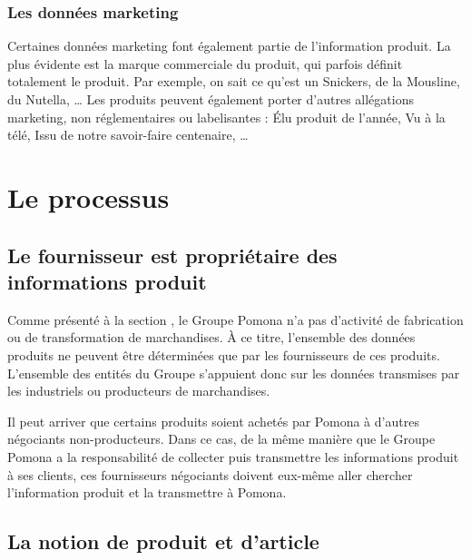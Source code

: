                 \subsubsection{Les données marketing}

                Certaines données marketing font également partie de l'information produit.
                La plus évidente est la marque commerciale du produit, qui parfois définit totalement le produit.
                Par exemple, on sait ce qu'est un Snickers, de la Mousline, du Nutella, \dots
                Les produits peuvent également porter d'autres allégations marketing, non réglementaires ou labelisantes : \'{E}lu produit de l'année, Vu à la télé, Issu de notre savoir-faire centenaire, \dots                

        \section{Le processus}
        
            \subsection{Le fournisseur est propriétaire des informations produit}

            Comme présenté à la section , le Groupe Pomona n'a pas d'activité de fabrication ou de transformation de marchandises.
            \`{A} ce titre, l'ensemble des données produits ne peuvent être déterminées que par les fournisseurs de ces produits.
            L'ensemble des entités du Groupe s'appuient donc sur les données transmises par les industriels ou producteurs de marchandises.

            Il peut arriver que certains produits soient achetés par Pomona à d'autres négociants non-producteurs.
            Dans ce cas, de la même manière que le Groupe Pomona a la responsabilité de collecter puis transmettre les informations produit à ses clients, ces fournisseurs négociants doivent eux-même aller chercher l'information produit et la transmettre à Pomona.


            \subsection{La notion de produit et d'article}
            \label{produit_article}

